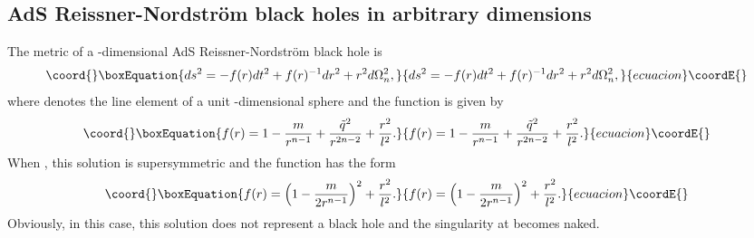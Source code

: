 \documentclass[a4paper,12pt]{article}
\begin{document}
\subsection{AdS Reissner-Nordstr\"om black holes in arbitrary dimensions}

The metric of a \coordHE{}-dimensional AdS Reissner-Nordstr\"om black hole
is \cite{CS,Cham}
\begin{equation}\coord{}\boxEquation{
\label{3eq1}
ds^2= -f(r)dt^2 +f(r)^{-1}dr^2 +r^2 d\Omega_n^2,
}{
ds^2= -f(r)dt^2 +f(r)^{-1}dr^2 +r^2 d\Omega_n^2,
}{ecuacion}\coordE{}\end{equation}
where \coordHE{} denotes the line element of a unit \coordHE{}-dimensional 
sphere and the function \coordHE{} is given by
\begin{equation}\coord{}\boxEquation{
\label{3eq2}
f(r)= 1-\frac{m}{r^{n-1}} +\frac{\tilde q^2}{r^{2n-2}} +\frac{r^2}{l^2}. 
}{
f(r)= 1-\frac{m}{r^{n-1}} +\frac{\tilde q^2}{r^{2n-2}} +\frac{r^2}{l^2}. 
}{ecuacion}\coordE{}\end{equation}
When \coordHE{}, this solution is supersymmetric and the function \coordHE{} 
has the form 
\begin{equation}\coord{}\boxEquation{
\label{req3}
f(r)= \left( 1-\frac{m}{2r^{n-1}}\right)^2 +\frac{r^2}{l^2}.
}{
f(r)= \left( 1-\frac{m}{2r^{n-1}}\right)^2 +\frac{r^2}{l^2}.
}{ecuacion}\coordE{}\end{equation}
Obviously, in this case, this solution does not represent a black hole and the
singularity at \coordHE{} becomes naked. 
\end{document}
